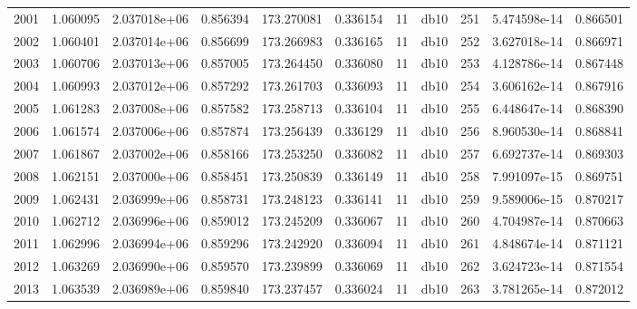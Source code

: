 \begin{tabular}{lrrrrrrlrrr}
2001 &    1.060095 &        2.037018e+06 &  0.856394 &              173.270081 &    0.336154 &      11 &         db10 &    251 &   5.474598e-14 &      0.866501 \\
2002 &    1.060401 &        2.037014e+06 &  0.856699 &              173.266983 &    0.336165 &      11 &         db10 &    252 &   3.627018e-14 &      0.866971 \\
2003 &    1.060706 &        2.037013e+06 &  0.857005 &              173.264450 &    0.336080 &      11 &         db10 &    253 &   4.128786e-14 &      0.867448 \\
2004 &    1.060993 &        2.037012e+06 &  0.857292 &              173.261703 &    0.336093 &      11 &         db10 &    254 &   3.606162e-14 &      0.867916 \\
2005 &    1.061283 &        2.037008e+06 &  0.857582 &              173.258713 &    0.336104 &      11 &         db10 &    255 &   6.448647e-14 &      0.868390 \\
2006 &    1.061574 &        2.037006e+06 &  0.857874 &              173.256439 &    0.336129 &      11 &         db10 &    256 &   8.960530e-14 &      0.868841 \\
2007 &    1.061867 &        2.037002e+06 &  0.858166 &              173.253250 &    0.336082 &      11 &         db10 &    257 &   6.692737e-14 &      0.869303 \\
2008 &    1.062151 &        2.037000e+06 &  0.858451 &              173.250839 &    0.336149 &      11 &         db10 &    258 &   7.991097e-15 &      0.869751 \\
2009 &    1.062431 &        2.036999e+06 &  0.858731 &              173.248123 &    0.336141 &      11 &         db10 &    259 &   9.589006e-15 &      0.870217 \\
2010 &    1.062712 &        2.036996e+06 &  0.859012 &              173.245209 &    0.336067 &      11 &         db10 &    260 &   4.704987e-14 &      0.870663 \\
2011 &    1.062996 &        2.036994e+06 &  0.859296 &              173.242920 &    0.336094 &      11 &         db10 &    261 &   4.848674e-14 &      0.871121 \\
2012 &    1.063269 &        2.036990e+06 &  0.859570 &              173.239899 &    0.336069 &      11 &         db10 &    262 &   3.624723e-14 &      0.871554 \\
2013 &    1.063539 &        2.036989e+06 &  0.859840 &              173.237457 &    0.336024 &      11 &         db10 &    263 &   3.781265e-14 &      0.872012 \\

\end{tabular}
